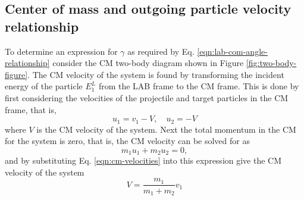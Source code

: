 \documentclass[../main.tex]{subfiles}
\begin{document}
\subsection{Center of mass and outgoing particle velocity relationship}
To determine an expression for $\gamma$ as required by Eq. \eqref{eqn:lab-com-angle-relationship} consider the CM two-body diagram shown in Figure \ref{fig:two-body-figure}. The CM velocity of the system is found by transforming the incident energy of the particle $E_1^L$ from the LAB frame to the CM frame. This is done by first considering the velocities of the projectile and target particles in the CM frame, that is,
\begin{equation} \label{eqn:cm-velocities}
    u_1 = v_1 - V, \quad u_2 = -V
\end{equation}
where $V$ is the CM velocity of the system. Next the total momentum in the CM for the system is zero, that is, the CM velocity can be solved for as
\begin{equation}
  m_1 u_1 + m_2 u_2 = 0,
\end{equation}
and by substituting Eq. \eqref{eqn:cm-velocities} into this expression give the CM velocity of the system
\begin{equation}
  V = \dfrac{m_1}{m_1 + m_2} v_1
\end{equation}
\end{document}
